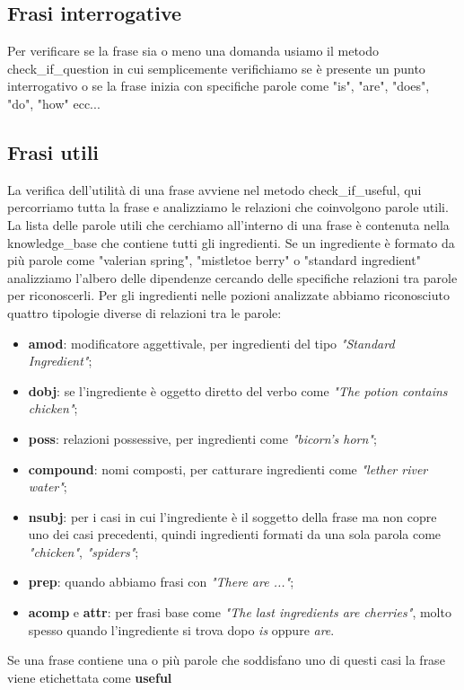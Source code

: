 \subsection{Frasi interrogative}
Per verificare se la frase sia o meno una domanda usiamo il metodo check\_if\_question in cui semplicemente verifichiamo se è presente un punto interrogativo o se la frase inizia con specifiche parole come "is", "are", "does", "do", "how" ecc...
\subsection{Frasi utili}
La verifica dell'utilità di una frase avviene nel metodo check\_if\_useful, qui percorriamo tutta la frase e analizziamo le relazioni che coinvolgono parole utili. La lista delle parole utili che cerchiamo all'interno di una frase è contenuta nella knowledge\_base che contiene tutti gli ingredienti. Se un ingrediente è formato da più parole come "valerian spring", "mistletoe berry" o  "standard ingredient" analizziamo l'albero delle dipendenze cercando delle specifiche relazioni tra parole per riconoscerli. Per gli ingredienti nelle pozioni analizzate abbiamo riconosciuto quattro tipologie diverse di relazioni tra le parole:
\begin{itemize}
    \item \textbf{amod}: modificatore aggettivale, per ingredienti del tipo \textit{"Standard Ingredient"};
    \item \textbf{dobj}: se l'ingrediente è oggetto diretto del verbo come \textit{"The potion contains chicken"};
    \item \textbf{poss}: relazioni possessive, per ingredienti come \textit{"bicorn's horn"};
    \item \textbf{compound}: nomi composti, per catturare ingredienti come \textit{"lether river water"};
    \item \textbf{nsubj}: per i casi in cui l'ingrediente è il soggetto della frase ma non copre uno dei casi precedenti, quindi ingredienti formati da una sola parola come \textit{"chicken"}, \textit{"spiders"};
    \item \textbf{prep}: quando abbiamo frasi con \textit{"There are ..."};
    \item \textbf{acomp} e \textbf{attr}: per frasi base come \textit{"The last ingredients are cherries"}, molto spesso quando l'ingrediente si trova dopo \textit{is} oppure \textit{are}.
\end{itemize}
Se una frase contiene una o più parole che soddisfano uno di questi casi la frase viene etichettata come \textbf{useful}

